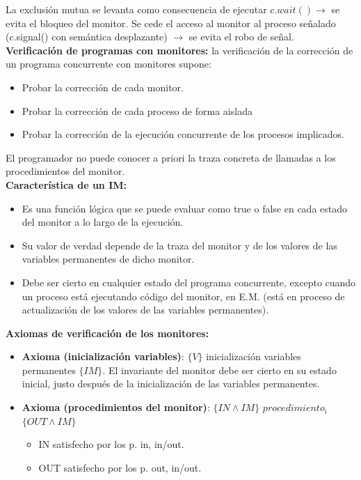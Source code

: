 \documentclass[a4paper,11pt]{article}
\begin{document}
La exclusión mutua se levanta como consecuencia de ejecutar $c.wait() \rightarrow$ se evita el bloqueo del monitor. Se cede el acceso al monitor al proceso señalado (c.signal() con semántica desplazante) $\rightarrow$ se evita el robo de señal. \\

\textbf{Verificación de programas con monitores:} la verificación de la corrección de un programa concurrente con monitores supone:

\begin{itemize}
\item Probar la corrección de cada monitor.
\item Probar la corrección de cada proceso de forma aislada
\item Probar la corrección de la ejecución concurrente de los procesos implicados.
\end{itemize}

El programador no puede conocer a priori la traza concreta de llamadas a los procedimientos del monitor. \\

\textbf{Característica de un IM:}
\begin{itemize}
\item Es una función lógica que se puede evaluar como true o false en cada estado del monitor a lo largo de la ejecución.

\item Su valor de verdad depende de la traza del monitor y de los valores de las variables permanentes de dicho monitor.

\item Debe ser cierto en cualquier estado del programa concurrente, excepto cuando un proceso está ejecutando código del monitor, en E.M. (está en proceso de actualización de los valores de las variables permanentes).
\end{itemize}

\textbf{Axiomas de verificación de los monitores:}

\begin{itemize}
\item \textbf{Axioma (inicialización variables)}: $\{V\}$ inicialización variables permanentes $\{IM\}$. El invariante del monitor debe ser cierto en su estado inicial, justo después de la inicialización de las variables permanentes.

\item \textbf{Axioma (procedimientos del monitor)}: $\{IN \wedge IM\}$ $procedimiento_i$ $\{OUT \wedge IM\}$
	\begin{itemize}
		\item IN satisfecho por los p. in, in/out.
		\item OUT satisfecho por los p. out, in/out.
	\end{itemize}
\end{itemize}
\end{document}
